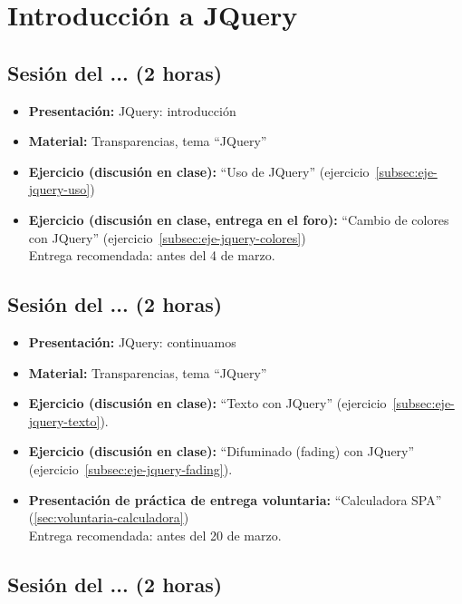 \documentclass[a4paper,12pt]{report}
\begin{document}
\section{Introducción a JQuery}


\subsection{Sesión del ... (2 horas)}

\begin{itemize}
\item \textbf{Presentación:} JQuery: introducción
\item \textbf{Material:} Transparencias, tema ``JQuery''
\item \textbf{Ejercicio (discusión en clase):} ``Uso de JQuery'' (ejercicio~\ref{subsec:eje-jquery-uso})
\item \textbf{Ejercicio (discusión en clase, entrega en el foro):} ``Cambio de colores con JQuery'' (ejercicio~\ref{subsec:eje-jquery-colores}) \\
  Entrega recomendada: antes del 4 de marzo.
\end{itemize}

\subsection{Sesión del ... (2 horas)}

\begin{itemize}
\item \textbf{Presentación:} JQuery: continuamos
\item \textbf{Material:} Transparencias, tema ``JQuery''
\item \textbf{Ejercicio (discusión en clase):} ``Texto con JQuery'' (ejercicio~\ref{subsec:eje-jquery-texto}).
\item \textbf{Ejercicio (discusión en clase):} ``Difuminado (fading) con JQuery'' (ejercicio~\ref{subsec:eje-jquery-fading}).
\item \textbf{Presentación de práctica de entrega voluntaria:} ``Calculadora SPA'' (\ref{sec:voluntaria-calculadora}) \\
  Entrega recomendada: antes del 20 de marzo.
\end{itemize}


\subsection{Sesión del ... (2 horas)}
\end{document}
